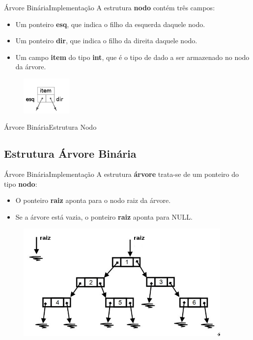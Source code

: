 \documentclass[aspectratio=169]{beamer}
\begin{document}
\begin{frame}{Árvore Binária}{Implementação}
A estrutura {\bf nodo} contém três campos:
\begin{itemize}
 \item Um ponteiro {\bf esq}, que indica o filho da esquerda daquele nodo.
 \item Um ponteiro {\bf dir}, que indica o filho da direita daquele nodo.
 \item Um campo {\bf item} do tipo {\bf int}, que é o tipo de dado a ser armazenado no nodo da árvore.
\end{itemize}
\begin{figure}[!h]
  \centering
  \includegraphics[width=70pt]{imagens/nodo.png}
  \label{fig_nodo}
\end{figure}
\end{frame}


\begin{frame}[fragile]{Árvore Binária}{Estrutura Nodo}
\begin{algorithm}[H]
\caption{Nodo} 
\label{Nodo}
\end{algorithm} 
\end{frame}

\subsection{Estrutura Árvore Binária}

\begin{frame}{Árvore Binária}{Implementação}
A estrutura {\bf árvore} trata-se de um ponteiro do tipo {\bf nodo}:
\begin{itemize}
 \item O ponteiro {\bf raiz} aponta para o nodo raiz da árvore.
 \item Se a árvore está vazia, o ponteiro {\bf raiz} aponta para NULL.
\end{itemize}
\begin{figure}[!h]
  \centering
  \includegraphics[width=300pt]{imagens/estrutura_arvore.png}
  \label{fig_estrutura_arvore}
\end{figure}
\end{frame}
\end{document}
